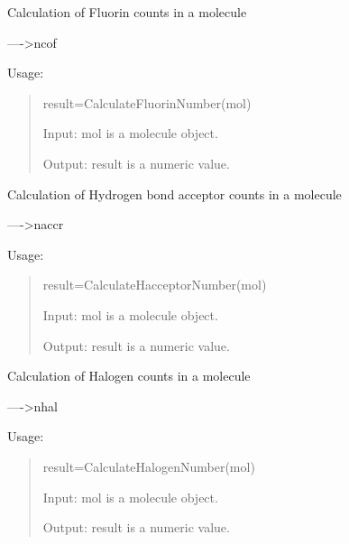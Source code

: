 \documentclass[letterpaper,10pt,english]{sphinxmanual}
\begin{document}

\begin{fulllineitems}
\label{reference/constitution:constitution.CalculateFluorinNumber}
Calculation of Fluorin counts in a molecule

----\textgreater{}ncof

Usage:
\begin{quote}

result=CalculateFluorinNumber(mol)

Input: mol is a molecule object.

Output: result is a numeric value.
\end{quote}

\end{fulllineitems}


\begin{fulllineitems}
\label{reference/constitution:constitution.CalculateHacceptorNumber}
Calculation of Hydrogen bond acceptor counts in a molecule

----\textgreater{}naccr

Usage:
\begin{quote}

result=CalculateHacceptorNumber(mol)

Input: mol is a molecule object.

Output: result is a numeric value.
\end{quote}

\end{fulllineitems}


\begin{fulllineitems}
\label{reference/constitution:constitution.CalculateHalogenNumber}
Calculation of Halogen counts in a molecule

----\textgreater{}nhal

Usage:
\begin{quote}

result=CalculateHalogenNumber(mol)

Input: mol is a molecule object.

Output: result is a numeric value.
\end{quote}

\end{fulllineitems}
\end{document}
